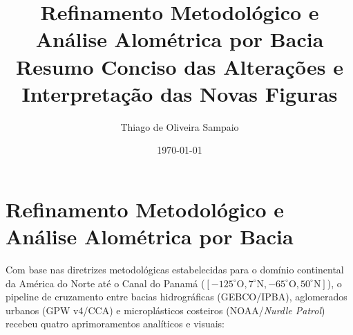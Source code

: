 \documentclass[12pt,a4paper]{article}
\title{\textbf{Refinamento Metodológico e Análise Alométrica por Bacia}\\[0.5ex]
\large Resumo Conciso das Alterações e Interpretação das Novas Figuras}
\author{Thiago de Oliveira Sampaio}
\date{\today}
\begin{document}
\maketitle

\section{Refinamento Metodológico e Análise Alométrica por Bacia}

Com base nas diretrizes metodológicas estabelecidas para o domínio continental da América do Norte até o Canal do Panamá ($[-125^\circ\text{O}, 7^\circ\text{N}, -65^\circ\text{O}, 50^\circ\text{N}]$), o pipeline de cruzamento entre bacias hidrográficas (GEBCO/IPBA), aglomerados urbanos (GPW v4/CCA) e microplásticos costeiros (NOAA/\textit{Nurdle Patrol}) recebeu quatro aprimoramentos analíticos e visuais:
\end{document}
